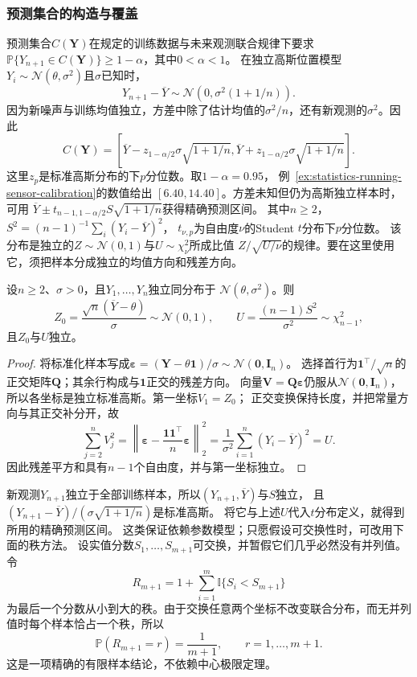 \subsubsection{预测集合的构造与覆盖}
\label{sec:probability-exchangeability-conformal-ranks}
\label{sec:rv-prediction-sets}
预测集合\(C(\bm Y)\)在规定的训练数据与未来观测联合规律下要求
\(\mathbb P\{Y_{n+1}\in C(\bm Y)\}\geq1-\alpha\)，其中\(0<\alpha<1\)。
在独立高斯位置模型\(Y_i\sim\mathcal N(\theta,\sigma^2)\)且\(\sigma\)已知时，
\[
Y_{n+1}-\overline Y\sim\mathcal N(0,\sigma^2(1+1/n)).
\]
因为新噪声与训练均值独立，方差中除了估计均值的\(\sigma^2/n\)，还有新观测的\(\sigma^2\)。因此
\[
C(\bm Y)=\left[\overline Y-z_{1-\alpha/2}\sigma\sqrt{1+1/n},
\overline Y+z_{1-\alpha/2}\sigma\sqrt{1+1/n}\right].
\]
这里\(z_p\)是标准高斯分布的下\(p\)分位数。取\(1-\alpha=0.95\)，
例~\ref{ex:statistics-running-sensor-calibration}的数值给出
\([6.40,14.40]\)。方差未知但仍为高斯独立样本时，可用
\(\overline Y\pm t_{n-1,1-\alpha/2}S\sqrt{1+1/n}\)获得精确预测区间。
其中\(n\geq2\)，\(S^2=(n-1)^{-1}\sum_i(Y_i-\overline Y)^2\)，
\(t_{\nu,p}\)为自由度\(\nu\)的Student \(t\)分布下\(p\)分位数。
该分布是独立的\(Z\sim\mathcal N(0,1)\)与\(U\sim\chi_\nu^2\)所成比值
\(Z/\sqrt{U/\nu}\)的规律。要在这里使用它，须把样本分成独立的均值方向和残差方向。

\begin{lemma}[高斯样本的均值与残差分解]
\label{lem:statistics-gaussian-mean-residual}
设\(n\geq2\)、\(\sigma>0\)，且\(Y_1,\ldots,Y_n\)独立同分布于
\(\mathcal N(\theta,\sigma^2)\)。则
\[
 Z_0=\frac{\sqrt n(\overline Y-\theta)}{\sigma}\sim\mathcal N(0,1),
 \qquad U=\frac{(n-1)S^2}{\sigma^2}\sim\chi^2_{n-1},
\]
且\(Z_0\)与\(U\)独立。
\end{lemma}
\begin{proof}
将标准化样本写成\(\bm\varepsilon=(\bm Y-\theta\bm1)/\sigma\sim\mathcal N(\bm0,\bm I_n)\)。
选择首行为\(\bm1^\top/\sqrt n\)的正交矩阵\(\bm Q\)；其余行构成与\(\bm1\)正交的残差方向。
向量\(\bm V=\bm Q\bm\varepsilon\)仍服从\(\mathcal N(\bm0,\bm I_n)\)，
所以各坐标是独立标准高斯。第一坐标\(V_1=Z_0\)；
正交变换保持长度，并把常量方向与其正交补分开，故
\[
 \sum_{j=2}^nV_j^2
 =\left\|\bm\varepsilon-\frac{\bm1\bm1^\top}{n}\bm\varepsilon\right\|_2^2
 =\frac1{\sigma^2}\sum_{i=1}^n(Y_i-\overline Y)^2=U.
\]
因此残差平方和具有\(n-1\)个自由度，并与第一坐标独立。
\end{proof}
新观测\(Y_{n+1}\)独立于全部训练样本，所以\((Y_{n+1},\overline Y)\)与\(S\)独立，
且\((Y_{n+1}-\overline Y)/(\sigma\sqrt{1+1/n})\)是标准高斯。
将它与上述\(U\)代入\(t\)分布定义，就得到所用的精确预测区间。
这类保证依赖参数模型；只愿假设可交换性时，可改用下面的秩方法。
设实值分数\(S_1,\ldots,S_{m+1}\)可交换，并暂假它们几乎必然没有并列值。令
\[ R_{m+1}
  =1+\sum_{i=1}^{m}\mathbb{I}\{S_i<S_{m+1}\} \]
为最后一个分数从小到大的秩。由于交换任意两个坐标不改变联合分布，而无并列值时每个样本恰占一个秩，所以
\begin{equation}
  \mathbb{P}(R_{m+1}=r)=\frac{1}{m+1},
  \qquad r=1,\ldots,m+1.
  \label{eq:probability-uniform-rank}
\end{equation}
这是一项精确的有限样本结论，不依赖中心极限定理。

